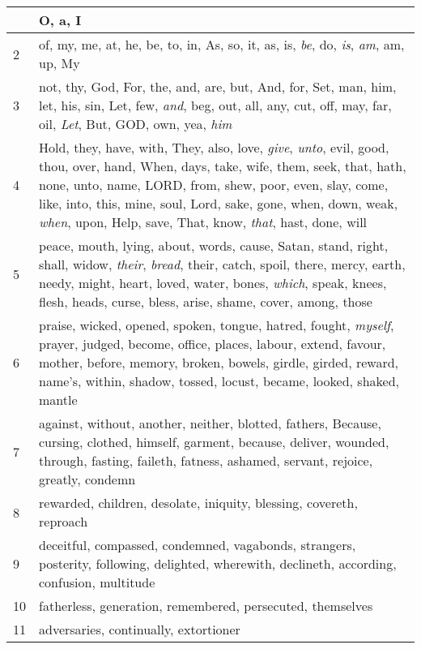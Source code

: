 \begin{longtable}{l|p{3.75in}}
\hline \hline
\endlastfoot
1 & O, a, I \\ \hline
2 & of, my, me, at, he, be, to, in, As, so, it, as, is, \emph{be}, do, \emph{is}, \emph{am}, am, up, My \\ \hline
3 & not, thy, God, For, the, and, are, but, And, for, Set, man, him, let, his, sin, Let, few, \emph{and}, beg, out, all, any, cut, off, may, far, oil, \emph{Let}, But, GOD, own, yea, \emph{him} \\ \hline
4 & Hold, they, have, with, They, also, love, \emph{give}, \emph{unto}, evil, good, thou, over, hand, When, days, take, wife, them, seek, that, hath, none, unto, name, LORD, from, shew, poor, even, slay, come, like, into, this, mine, soul, Lord, sake, gone, when, down, weak, \emph{when}, upon, Help, save, That, know, \emph{that}, hast, done, will \\ \hline
5 & peace, mouth, lying, about, words, cause, Satan, stand, right, shall, widow, \emph{their}, \emph{bread}, their, catch, spoil, there, mercy, earth, needy, might, heart, loved, water, bones, \emph{which}, speak, knees, flesh, heads, curse, bless, arise, shame, cover, among, those \\ \hline
6 & praise, wicked, opened, spoken, tongue, hatred, fought, \emph{myself}, prayer, judged, become, office, places, labour, extend, favour, mother, before, memory, broken, bowels, girdle, girded, reward, name's, within, shadow, tossed, locust, became, looked, shaked, mantle \\ \hline
7 & against, without, another, neither, blotted, fathers, Because, cursing, clothed, himself, garment, because, deliver, wounded, through, fasting, faileth, fatness, ashamed, servant, rejoice, greatly, condemn \\ \hline
8 & rewarded, children, desolate, iniquity, blessing, covereth, reproach \\ \hline
9 & deceitful, compassed, condemned, vagabonds, strangers, posterity, following, delighted, wherewith, declineth, according, confusion, multitude \\ \hline
10 & fatherless, generation, remembered, persecuted, themselves \\ \hline
11 & adversaries, continually, extortioner \\ \hline
\end{longtable}






 



